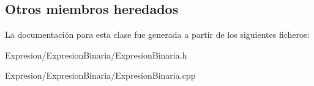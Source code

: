 \subsection*{Otros miembros heredados}


La documentación para esta clase fue generada a partir de los siguientes ficheros\-:\begin{DoxyCompactItemize}
\item 
Expresion/\-Expresion\-Binaria/Expresion\-Binaria.\-h\item 
Expresion/\-Expresion\-Binaria/Expresion\-Binaria.\-cpp\end{DoxyCompactItemize}
